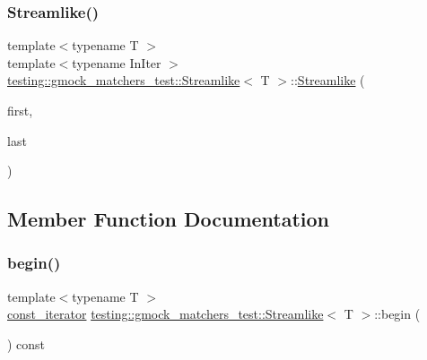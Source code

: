 \subsubsection{\texorpdfstring{Streamlike()}{Streamlike()}}
{\footnotesize\ttfamily template$<$typename T $>$ \\
template$<$typename In\+Iter $>$ \\
\hyperlink{classtesting_1_1gmock__matchers__test_1_1_streamlike}{testing\+::gmock\+\_\+matchers\+\_\+test\+::\+Streamlike}$<$ T $>$\+::\hyperlink{classtesting_1_1gmock__matchers__test_1_1_streamlike}{Streamlike} (\begin{DoxyParamCaption}\item[{In\+Iter}]{first,  }\item[{In\+Iter}]{last }\end{DoxyParamCaption})\hspace{0.3cm}{\ttfamily [inline]}}



\subsection{Member Function Documentation}
\mbox{\label{classtesting_1_1gmock__matchers__test_1_1_streamlike_a1ac125e14fd2358cdb727e0044ef7f01}} 
\subsubsection{\texorpdfstring{begin()}{begin()}}
{\footnotesize\ttfamily template$<$typename T $>$ \\
\hyperlink{classtesting_1_1gmock__matchers__test_1_1_streamlike_a2eeb61dca56f70d0266f5f8ae91d2c7b}{const\+\_\+iterator} \hyperlink{classtesting_1_1gmock__matchers__test_1_1_streamlike}{testing\+::gmock\+\_\+matchers\+\_\+test\+::\+Streamlike}$<$ T $>$\+::begin (\begin{DoxyParamCaption}{ }\end{DoxyParamCaption}) const\hspace{0.3cm}{\ttfamily [inline]}}

\mbox{\label{classtesting_1_1gmock__matchers__test_1_1_streamlike_a3e3aa6924974abcf7855dab1094bd860}} 
